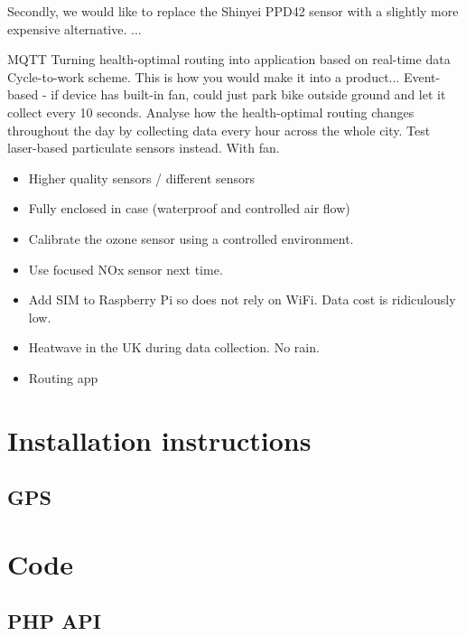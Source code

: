 \documentclass[11pt]{report}
\begin{document}
Secondly, we would like to replace the Shinyei PPD42 sensor with a slightly more expensive alternative. ...

MQTT
Turning health-optimal routing into application based on real-time data
Cycle-to-work scheme.
This is how you would make it into a product...
Event-based - if device has built-in fan, could just park bike outside ground and let it collect every 10 seconds.
Analyse how the health-optimal routing changes throughout the day by collecting data every hour across the whole city.
Test laser-based particulate sensors instead. With fan.


\begin{itemize}
\item Higher quality sensors / different sensors
\item Fully enclosed in case (waterproof and controlled air flow)
\item Calibrate the ozone sensor using a controlled environment.
\item Use focused NOx sensor next time.
\item Add SIM to Raspberry Pi so does not rely on WiFi. Data cost is ridiculously low.
\item Heatwave in the UK during data collection. No rain.
\item Routing app
\end{itemize}

\clearpage
\newpage
{}


\pagebreak

\appendix

\chapter{Installation instructions}

\section{GPS}

\chapter{Code}

\section{PHP API} \label{php_api}
\end{document}
